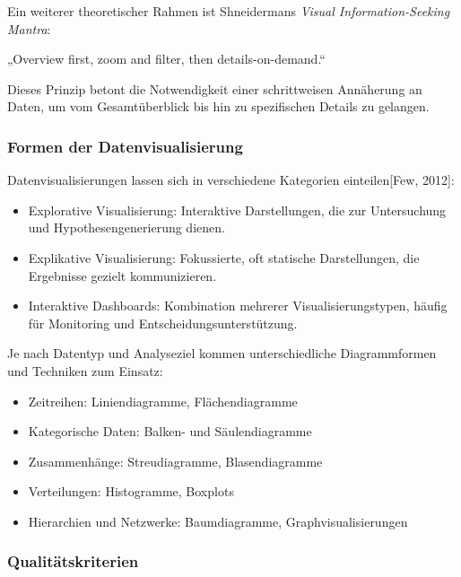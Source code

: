 Ein weiterer theoretischer Rahmen ist Shneidermans \textit{Visual Information-Seeking Mantra}:



„Overview first, zoom and filter, then details-on-demand.“

Dieses Prinzip betont die Notwendigkeit einer schrittweisen Annäherung an Daten, um vom Gesamtüberblick bis hin zu
spezifischen Details zu gelangen.


\subsubsection{Formen der Datenvisualisierung}

Datenvisualisierungen lassen sich in verschiedene Kategorien einteilen[Few, 2012]:

\begin{itemize}

\item
Explorative Visualisierung: Interaktive Darstellungen, die zur Untersuchung und Hypothesengenerierung dienen.
\item
Explikative Visualisierung: Fokussierte, oft statische Darstellungen, die Ergebnisse gezielt kommunizieren.
\item
Interaktive Dashboards: Kombination mehrerer Visualisierungstypen, häufig für Monitoring und Entscheidungsunterstützung.

\end{itemize}

Je nach Datentyp und Analyseziel kommen unterschiedliche Diagrammformen und Techniken zum Einsatz:

\begin{itemize}

\item
Zeitreihen: Liniendiagramme, Flächendiagramme
\item
Kategorische Daten: Balken- und Säulendiagramme
\item
Zusammenhänge: Streudiagramme, Blasendiagramme
\item
Verteilungen: Histogramme, Boxplots
\item
Hierarchien und Netzwerke: Baumdiagramme, Graphvisualisierungen

\end{itemize}

\subsubsection{Qualitätskriterien}

